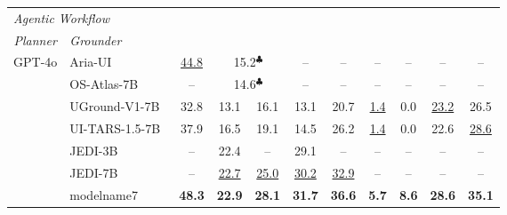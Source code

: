 \begin{table}[t]
{\begin{tabular}{@{}c l c cc cc cc cc @{}}
\midrule
\midrule
\multicolumn{11}{l}{\quad\quad\textit{Agentic Workflow}} \\
\cmidrule(l){1-2}
\textit{Planner} &\quad\quad\quad\textit{Grounder} & \multicolumn{9}{c}{} \\
\midrule
\multirow{7}{*}{GPT-4o}
 &  Aria-UI~\citeyearpar{yang2024aria}   & \underline{44.8} & \multicolumn{2}{c}{15.2$^\clubsuit$}& -- & -- & -- & -- & -- & -- \\
&  OS-Atlas-7B~\citeyearpar{wu2024osatlas}   & -- & \multicolumn{2}{c}{14.6$^\clubsuit$} & -- & -- & -- & -- & -- & -- \\
& UGround-V1-7B~\citeyearpar{gou2024navigating} & 32.8 & 13.1 & 16.1 & 13.1 & 20.7 & \underline{1.4} & 0.0 & \underline{23.2} & 26.5 \\
 &  UI-TARS-1.5-7B~\citeyearpar{qin2025uitars}   & 37.9 & 16.5 & 19.1 & 14.5 & 26.2 & \underline{1.4} & 0.0 & 22.6 & \underline{28.6} \\
%
 &  JEDI-3B~\citeyearpar{xie2025scalingcomputerusegroundinguser}   & -- & 22.4 & -- & 29.1 & -- & -- & -- & -- & -- \\
 &  JEDI-7B~\citeyearpar{xie2025scalingcomputerusegroundinguser}   & -- & \underline{22.7} & \underline{25.0} & \underline{30.2} & \underline{32.9} & -- & -- & -- & -- \\
 \cmidrule(lr){2-11}
 &  modelname{7}   & \textbf{48.3} & \textbf{22.9} & \textbf{28.1} & \textbf{31.7} & \textbf{36.6} & \textbf{5.7} & \textbf{8.6} & \textbf{28.6} & \textbf{35.1} \\
\bottomrule
\end{tabular}
}
\vspace{-1em}
\end{table}

